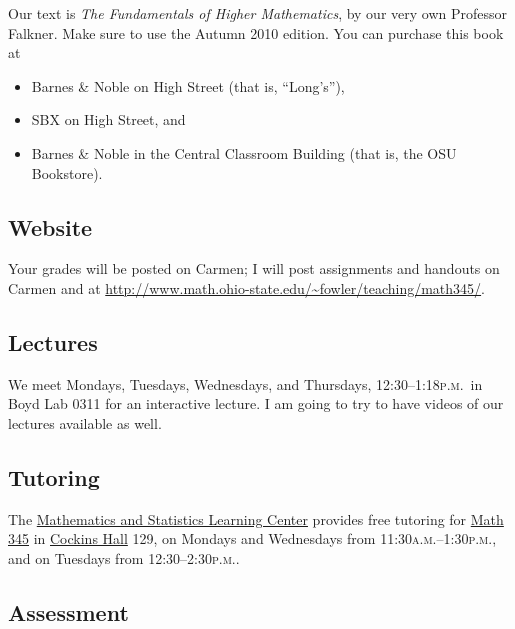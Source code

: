 \documentclass[12pt]{handout}
\newcommand{\peem}{\textsc{p.m.}}
\newcommand{\ayem}{\textsc{a.m.}}
\begin{document}
Our text is \textit{The Fundamentals of Higher
Mathematics}, by our very own Professor Falkner.  Make sure to use the
Autumn 2010 edition.  You can purchase this book at
\begin{itemize}
\item Barnes \& Noble on High Street (that is, ``Long's''),
\item SBX on High Street, and
\item Barnes \& Noble in the Central Classroom Building (that is, the OSU Bookstore).
\end{itemize}

\subsection*{Website}
Your grades will be posted on Carmen; I will post assignments and handouts on Carmen and at
\url{http://www.math.ohio-state.edu/~fowler/teaching/math345/}.

\subsection*{Lectures}
We meet Mondays, Tuesdays, Wednesdays, and Thursdays,
12:30--1:18\peem\ in Boyd Lab 0311 for an interactive lecture.  I am going to try to have videos of our lectures available as well.

\subsection*{Tutoring}

The \href{http://www.mslc.ohio-state.edu/}{Mathematics and Statistics Learning Center} provides free tutoring
for \href{http://www.mslc.ohio-state.edu/about/location/345}{Math 345} in \href{http://www.osu.edu/map/building.php?building=063}{Cockins Hall} 129, on Mondays and Wednesdays from 11:30\ayem--1:30\peem, and on Tuesdays from 12:30--2:30\peem.


\vfill
\pagebreak
\subsection*{Assessment}
\end{document}
